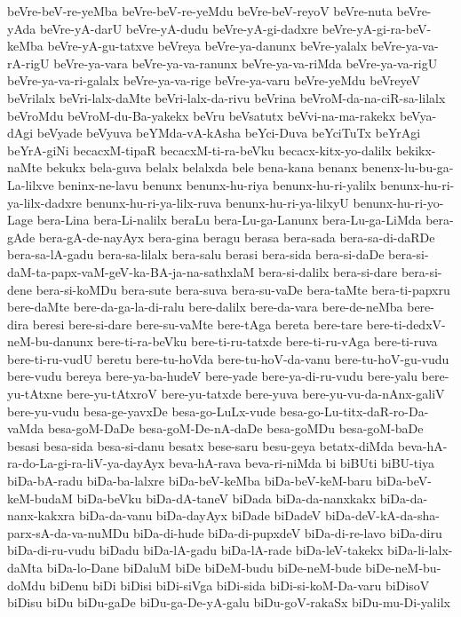 {beVre-beV-re-yeMba
beVre-beV-re-yeMdu
beVre-beV-reyoV
beVre-nuta
beVre-yAda
beVre-yA-darU
beVre-yA-dudu
beVre-yA-gi-dadxre
beVre-yA-gi-ra-beV-keMba
beVre-yA-gu-tatxve
beVreya
beVre-ya-danunx
beVre-yalalx
beVre-ya-va-rA-rigU
beVre-ya-vara
beVre-ya-va-ranunx
beVre-ya-va-riMda
beVre-ya-va-rigU
beVre-ya-va-ri-galalx
beVre-ya-va-rige
beVre-ya-varu
beVre-yeMdu
beVreyeV
beVrilalx
beVri-lalx-daMte
beVri-lalx-da-rivu
beVrina
beVroM-da-na-ciR-sa-lilalx
beVroMdu
beVroM-du-Ba-yakekx
beVru
beVsatutx
beVvi-na-ma-rakekx
beVya-dAgi
beVyade
beVyuva
beYMda-vA-kAsha
beYci-Duva
beYciTuTx
beYrAgi
beYrA-giNi
becacxM-tipaR
becacxM-ti-ra-beVku
becacx-kitx-yo-dalilx
bekikx-naMte
bekukx
bela-guva
belalx
belalxda
bele
bena-kana
benanx
benenx-lu-bu-ga-La-lilxve
beninx-ne-lavu
benunx
benunx-hu-riya
benunx-hu-ri-yalilx
benunx-hu-ri-ya-lilx-dadxre
benunx-hu-ri-ya-lilx-ruva
benunx-hu-ri-ya-lilxyU
benunx-hu-ri-yo-Lage
bera-Lina
bera-Li-nalilx
beraLu
bera-Lu-ga-Lanunx
bera-Lu-ga-LiMda
bera-gAde
bera-gA-de-nayAyx
bera-gina
beragu
berasa
bera-sada
bera-sa-di-daRDe
bera-sa-lA-gadu
bera-sa-lilalx
bera-salu
berasi
bera-sida
bera-si-daDe
bera-si-daM-ta-papx-vaM-geV-ka-BA-ja-na-sathxlaM
bera-si-dalilx
bera-si-dare
bera-si-dene
bera-si-koMDu
bera-sute
bera-suva
bera-su-vaDe
bera-taMte
bera-ti-papxru
bere-daMte
bere-da-ga-la-di-ralu
bere-dalilx
bere-da-vara
bere-de-neMba
bere-dira
beresi
bere-si-dare
bere-su-vaMte
bere-tAga
bereta
bere-tare
bere-ti-dedxV-neM-bu-danunx
bere-ti-ra-beVku
bere-ti-ru-tatxde
bere-ti-ru-vAga
bere-ti-ruva
bere-ti-ru-vudU
beretu
bere-tu-hoVda
bere-tu-hoV-da-vanu
bere-tu-hoV-gu-vudu
bere-vudu
bereya
bere-ya-ba-hudeV
bere-yade
bere-ya-di-ru-vudu
bere-yalu
bere-yu-tAtxne
bere-yu-tAtxroV
bere-yu-tatxde
bere-yuva
bere-yu-vu-da-nAnx-galiV
bere-yu-vudu
besa-ge-yavxDe
besa-go-LuLx-vude
besa-go-Lu-titx-daR-ro-Da-vaMda
besa-goM-DaDe
besa-goM-De-nA-daDe
besa-goMDu
besa-goM-baDe
besasi
besa-sida
besa-si-danu
besatx
bese-saru
besu-geya
betatx-diMda
beva-hA-ra-do-La-gi-ra-liV-ya-dayAyx
beva-hA-rava
beva-ri-niMda
bi
biBUti
biBU-tiya
biDa-bA-radu
biDa-ba-lalxre
biDa-beV-keMba
biDa-beV-keM-baru
biDa-beV-keM-budaM
biDa-beVku
biDa-dA-taneV
biDada
biDa-da-nanxkakx
biDa-da-nanx-kakxra
biDa-da-vanu
biDa-dayAyx
biDade
biDadeV
biDa-deV-kA-da-sha-parx-sA-da-va-nuMDu
biDa-di-hude
biDa-di-pupxdeV
biDa-di-re-lavo
biDa-diru
biDa-di-ru-vudu
biDadu
biDa-lA-gadu
biDa-lA-rade
biDa-leV-takekx
biDa-li-lalx-daMta
biDa-lo-Dane
biDaluM
biDe
biDeM-budu
biDe-neM-bude
biDe-neM-bu-doMdu
biDenu
biDi
biDisi
biDi-siVga
biDi-sida
biDi-si-koM-Da-varu
biDisoV
biDisu
biDu
biDu-gaDe
biDu-ga-De-yA-galu
biDu-goV-rakaSx
biDu-mu-Di-yalilx
}
